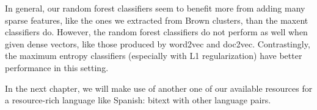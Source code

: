 In general, our random forest classifiers seem to benefit more from adding many
sparse features, like the ones we extracted from Brown clusters, than the
maxent classifiers do. However, the random forest classifiers do not perform as
well when given dense vectors, like those produced by word2vec and doc2vec.
Contrastingly, the maximum entropy classifiers (especially with L1
regularization) have better performance in this setting.

In the next chapter, we will make use of another one of our available resources
for a resource-rich language like Spanish: bitext with other language pairs.
